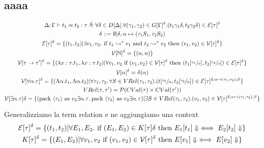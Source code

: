 \documentclass{article}
\begin{document}
\subsection{aaaa}
\begin{gather*}
    \Delta;\Gamma\vdash t_1 \approx t_2:\tau \triangleq \forall \delta\in D[\Delta].\forall(\gamma_1,\gamma_2) \in G[\Gamma]^\delta. (t_1\gamma_1\delta , t_2\gamma_2\delta)\in \mathcal{E}[\tau]^\delta \\
    \delta ::= \emptyset | \delta,\alpha\mapsto (\tau_1S_1, \tau_2S_2) \\
    \mathcal{E}[\tau]^\delta = \{(t_1,t_2)|\exists v_1,v_2. \text{ if } t_1\leadsto^{*}v_1 \text{ and } t_2\leadsto^{*}v_2 \text{ then } (v_1,v_2) \in \mathcal{V}[\tau]^\delta\} \\
    \mathcal{V}[\mathbb N]^\delta = \{(n,n)\} \\
    \mathcal{V}[\tau\to\tau']^\delta = \{(\lambda x:\tau.t_1,\lambda x:\tau.t_2) | \forall v_1,v_2 \text{ if } (v_1,v_2)\in\mathcal{V}[\tau]^\delta \text{ then } (t_1[\sfrac{v_1}x],t_2[\sfrac{v_2}x]) \in \mathcal{E}[\tau]^\delta\} \\
    \mathcal{V}[\alpha]^\delta = \delta(\alpha) \\
\mathcal{V}[\forall\alpha.\tau]^\delta=\{(\Lambda\alpha.t_1,\Lambda\alpha.t_2)|\forall \tau_1,\tau_2,\forall S\in VRel(\tau_1,\tau_2).    (t[\sfrac{\tau_1}\alpha,t_2[\sfrac{\tau_2}\alpha])\in\mathcal{E}[\tau]^{\delta, \alpha\mapsto(\tau_1,\tau_2);S}\} \\
VRel(\tau,\tau') = \mathcal{P}(CVal(\tau)\times CVal(\tau')) \\
\mathcal{V}[\exists\alpha.\tau]\delta = \{(\text{pack } \langle\tau_1\rangle \text{ as } v_2 {\exists\alpha.\tau},\text{pack } \langle\tau_2\rangle \text{ as } v_2 {\exists \alpha.\tau}) | \exists S\in VRel(\tau_1,\tau_2). (v_1,v_2)\in\mathcal{V}[\tau]^{\delta,\alpha\mapsto(\tau_1,\tau_2),S}\} \\
\end{gather*}

Generalizziamo la term relation e ne aggiungiamo una context 
\begin{gather*}
    \mathcal{E}[\tau]^\delta = \{(t_1,t_2)|\forall E_1,E_2. \text{ if } (E_1,E_2)\in K[\tau]\delta\text{ then } E_1[t_1]\Downarrow\iff E_2[t_2]\Downarrow\} \\
    K[\tau]^\delta = \{(E_1,E_2)|\forall v_1,v_2 \text{ if } (v_1,v_2)\in\mathcal{V}[\tau]^\delta\text{ then } E[v_1]\Downarrow\iff E[v_2]\Downarrow\}
\end{gather*}
\end{document}
